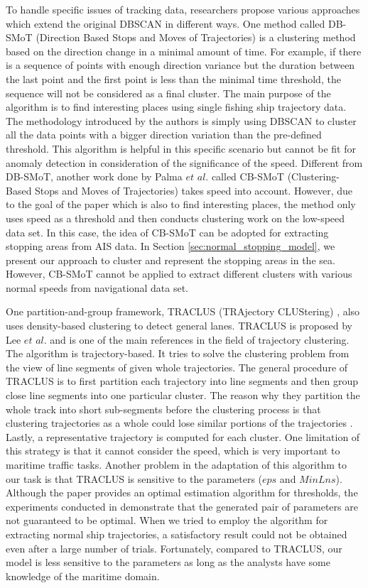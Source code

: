 \documentclass[12pt,glossary]{dalcsthesis}
\begin{document}
To handle specific issues of tracking data, researchers propose various approaches which extend the original DBSCAN in different ways.   One method called DB-SMoT (Direction Based Stops and Moves of Trajectories) \cite{DDBscan} is a clustering method based on the direction change in a minimal amount of time. For example, if there is a sequence of points with enough direction variance but the duration between the last point and the first point is less than the minimal time threshold, the sequence will not be considered as a final cluster. The main purpose of the algorithm is to find interesting places using single fishing ship trajectory data. The methodology introduced by the authors is simply using DBSCAN to cluster all the data points with a bigger direction variation than the pre-defined threshold. This algorithm is helpful in this specific scenario but cannot be fit for anomaly detection in consideration of the significance of the speed. Different from DB-SMoT, another work done by Palma $et$ $al.$ \cite{CBSMoT} called CB-SMoT (Clustering-Based Stops and Moves of Trajectories) takes speed into account. However, due to the goal of the paper which is also to find interesting places, the method only uses speed as a threshold and then conducts clustering work on the low-speed data set. In this case, the idea of CB-SMoT can be adopted for extracting stopping areas from AIS data. In Section \ref{sec:normal_stopping_model}, we present our approach to cluster and represent the stopping areas in the sea. However, CB-SMoT cannot be applied to extract different clusters with various normal speeds from navigational data set. 



One partition-and-group framework, TRACLUS (TRAjectory CLUStering) \cite{Lee07}, also uses density-based clustering to detect general lanes. TRACLUS is proposed by Lee $et$ $al$. \cite{Lee07} and is one of the main references in the field of trajectory clustering.  The algorithm is trajectory-based. It tries to solve the clustering problem from the view of line segments of given whole trajectories. The general procedure of TRACLUS is to first partition each trajectory into line segments and then group close line segments into one particular cluster.  The reason why they partition the whole track into short sub-segments before the clustering process is that clustering trajectories as a whole could lose similar portions of the trajectories \cite{Lee07}. Lastly, a representative trajectory is computed for each cluster. One limitation of this strategy is that it cannot consider the speed, which is very important to maritime traffic tasks. Another problem in the adaptation of this algorithm to our task is that TRACLUS is sensitive to the parameters ($eps$ and $MinLns$). Although the paper provides an optimal estimation algorithm for thresholds, the experiments conducted in \cite{Lee07} demonstrate that the generated pair of parameters are not guaranteed to be optimal. When we tried to employ the algorithm for extracting normal ship trajectories, a satisfactory result could not be obtained even after a large number of trials. Fortunately, compared to TRACLUS, our model is less sensitive to the parameters as long as the analysts have some knowledge of the maritime domain.
\end{document}

